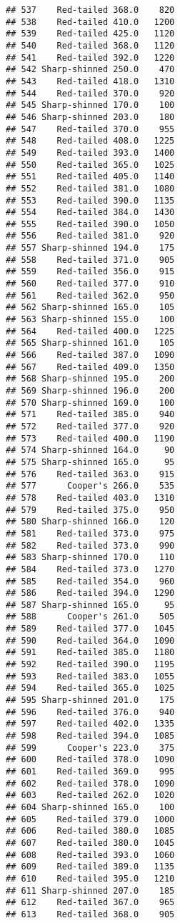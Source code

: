 \documentclass[
]{article}
\begin{document}
\begin{verbatim}
## 537    Red-tailed 368.0    820
## 538    Red-tailed 410.0   1200
## 539    Red-tailed 425.0   1120
## 540    Red-tailed 368.0   1120
## 541    Red-tailed 392.0   1220
## 542 Sharp-shinned 250.0    470
## 543    Red-tailed 418.0   1310
## 544    Red-tailed 370.0    920
## 545 Sharp-shinned 170.0    100
## 546 Sharp-shinned 203.0    180
## 547    Red-tailed 370.0    955
## 548    Red-tailed 408.0   1225
## 549    Red-tailed 393.0   1400
## 550    Red-tailed 365.0   1025
## 551    Red-tailed 405.0   1140
## 552    Red-tailed 381.0   1080
## 553    Red-tailed 390.0   1135
## 554    Red-tailed 384.0   1430
## 555    Red-tailed 390.0   1050
## 556    Red-tailed 381.0    920
## 557 Sharp-shinned 194.0    175
## 558    Red-tailed 371.0    905
## 559    Red-tailed 356.0    915
## 560    Red-tailed 377.0    910
## 561    Red-tailed 362.0    950
## 562 Sharp-shinned 165.0    105
## 563 Sharp-shinned 155.0    100
## 564    Red-tailed 400.0   1225
## 565 Sharp-shinned 161.0    105
## 566    Red-tailed 387.0   1090
## 567    Red-tailed 409.0   1350
## 568 Sharp-shinned 195.0    200
## 569 Sharp-shinned 196.0    200
## 570 Sharp-shinned 169.0    100
## 571    Red-tailed 385.0    940
## 572    Red-tailed 377.0    920
## 573    Red-tailed 400.0   1190
## 574 Sharp-shinned 164.0     90
## 575 Sharp-shinned 165.0     95
## 576    Red-tailed 363.0    915
## 577      Cooper's 266.0    535
## 578    Red-tailed 403.0   1310
## 579    Red-tailed 375.0    950
## 580 Sharp-shinned 166.0    120
## 581    Red-tailed 373.0    975
## 582    Red-tailed 373.0    990
## 583 Sharp-shinned 170.0    110
## 584    Red-tailed 373.0   1270
## 585    Red-tailed 354.0    960
## 586    Red-tailed 394.0   1290
## 587 Sharp-shinned 165.0     95
## 588      Cooper's 261.0    505
## 589    Red-tailed 377.0   1045
## 590    Red-tailed 364.0   1090
## 591    Red-tailed 385.0   1180
## 592    Red-tailed 390.0   1195
## 593    Red-tailed 383.0   1055
## 594    Red-tailed 365.0   1025
## 595 Sharp-shinned 201.0    175
## 596    Red-tailed 376.0    940
## 597    Red-tailed 402.0   1335
## 598    Red-tailed 394.0   1085
## 599      Cooper's 223.0    375
## 600    Red-tailed 378.0   1090
## 601    Red-tailed 369.0    995
## 602    Red-tailed 378.0   1090
## 603    Red-tailed 262.0   1020
## 604 Sharp-shinned 165.0    100
## 605    Red-tailed 379.0   1000
## 606    Red-tailed 380.0   1085
## 607    Red-tailed 380.0   1045
## 608    Red-tailed 393.0   1060
## 609    Red-tailed 389.0   1135
## 610    Red-tailed 395.0   1210
## 611 Sharp-shinned 207.0    185
## 612    Red-tailed 367.0    965
## 613    Red-tailed 368.0    905

\end{verbatim}
\end{document}
